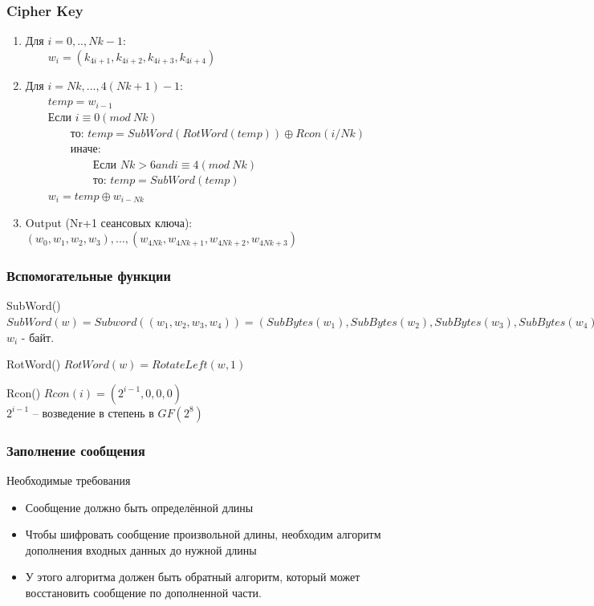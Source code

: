 \documentclass[10pt, typeface=serif(roman), pdf,hyperref={unicode}, aspectratio=169]{beamer}
\begin{document}
\begin{frame}
	\frametitle{Cipher Key}
	\begin{enumerate}
		\item Для \(i = 0,..,Nk-1:\)\\
		~~~~\(w_i = (k_{4i+1},k_{4i+2},k_{4i+3},k_{4i+4})\)
		\item Для \(i=Nk,...,4(Nk+1)-1:\)\\
		~~~~\(temp = w_{i-1}\)\\
		~~~~Если \(i \equiv 0 (mod ~Nk)\)\\
		~~~~~~~~то: \(temp = SubWord(RotWord(temp)) \oplus Rcon(i/Nk)\) \\
		~~~~~~~~иначе:\\
		~~~~~~~~~~~~Если \(Nk > 6 and i \equiv 4 (mod~Nk)\)\\
		~~~~~~~~~~~~то: \(temp = SubWord(temp)\)\\
		~~~~\(w_i = temp \oplus w_{i-Nk}\)
		\item Output (Nr+1 сеансовых ключа):\\
		\((w_0,w_1,w_2,w_3),...,(w_{4Nk},w_{4Nk+1},w_{4Nk+2},w_{4Nk+3})\)
	\end{enumerate}
	
\end{frame}

\begin{frame}
	\frametitle{Вспомогательные функции}
	\begin{block}
		{
			SubWord()
		}
		\(SubWord(w) = Subword((w_1,w_2,w_3,w_4)) = (SubBytes(w_1),SubBytes(w_2),SubBytes(w_3),SubBytes(w_4))\)\\ \(w_i\) - байт.
	\end{block}
	\begin{block}
		{
			RotWord()
		}
		\(RotWord(w) = RotateLeft(w,1)\)
	\end{block}
	\begin{block}
		{
			Rcon()
		}
		\(Rcon(i) = (2^{i-1},0,0,0)\)\\
		\(2^{i-1}\) -- возведение в степень в \(GF(2^8)\)
	\end{block}
\end{frame}



\begin{frame}
	\frametitle{Заполнение сообщения}
	\begin{block}
		{
			Необходимые требования
		}
		\begin{itemize}
			\item Сообщение должно быть определённой длины
			\item Чтобы шифровать сообщение произвольной длины, необходим алгоритм дополнения входных данных до нужной длины
			\item У этого алгоритма должен быть обратный алгоритм, который может восстановить сообщение по дополненной части.
		\end{itemize}
	\end{block}
\end{frame}
\end{document}

